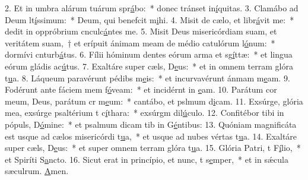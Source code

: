 2. Et in umbra alárum tuárum spr\uline{á}bo:~* donec tránset in\uline{í}quitas.
3. Clamábo ad Deum lt\uline{í}ssimum:~* Deum, qui benefcit m\uline{i}hi.
4. Misit de cælo, et libr\uline{á}vit me:~* dedit in oppróbrium cnculc\uline{á}ntes me.
5. Misit Deus misericórdiam suam, et veritátem suam,~† et erípuit ánimam meam de médio catulórum l\uline{ó}num:~* dormívi cnturb\uline{á}tus.
6. Fílii hóminum dentes eórum arma et sg\uline{í}ttæ:~* et lingua eórum gládis ac\uline{ú}tus.
7. Exaltáre super cæls, D\uline{e}us:~* et in omnem terram glóra t\uline{u}a.
8. Láqueum paravérunt pédibs m\uline{e}is:~* et incurvavérunt ánmam m\uline{e}am.
9. Fodérunt ante fáciem mem f\uline{ó}veam:~* et incidérnt in \uline{e}am.
10. Parátum cor meum, Deus, parátum cr m\uline{e}um:~* cantábo, et pslmum d\uline{i}cam.
11. Exsúrge, glória mea, exsúrge psaltérium t c\uline{í}thara:~* exsúrgm dil\uline{ú}culo.
12. Confitébor tibi in pópuls, D\uline{ó}mine:~* et psalmum dicam tib in G\uline{é}ntibus:
13. Quóniam magnificáta est usque ad cælos misericórdi t\uline{u}a,~* et usque ad nubes vértas t\uline{u}a.
14. Exaltáre super cæls, D\uline{e}us:~* et super omnem terram glóra t\uline{u}a.
15. Glória Patri, t F\uline{í}lio,~* et Spiríti S\uline{a}ncto.
16. Sicut erat in princípio, et nunc, t s\uline{e}mper,~* et in sǽcula sæculrum. \uline{A}men.
